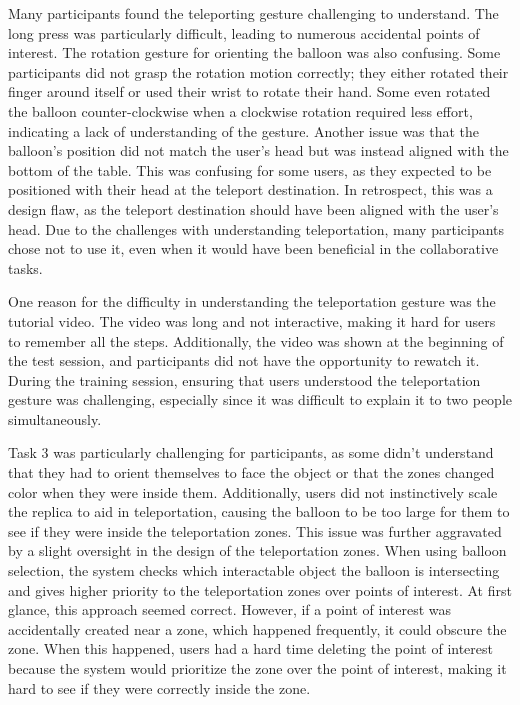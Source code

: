         Many participants found the teleporting gesture challenging to understand. The long press was particularly difficult, leading to numerous accidental points of interest. The rotation gesture for orienting the balloon was also confusing. Some participants did not grasp the rotation motion correctly; they either rotated their finger around itself or used their wrist to rotate their hand. Some even rotated the balloon counter-clockwise when a clockwise rotation required less effort, indicating a lack of understanding of the gesture. Another issue was that the balloon's position did not match the user's head but was instead aligned with the bottom of the table. This was confusing for some users, as they expected to be positioned with their head at the teleport destination. In retrospect, this was a design flaw, as the teleport destination should have been aligned with the user's head. Due to the challenges with understanding teleportation, many participants chose not to use it, even when it would have been beneficial in the collaborative tasks.
        
        One reason for the difficulty in understanding the teleportation gesture was the tutorial video. The video was long and not interactive, making it hard for users to remember all the steps. Additionally, the video was shown at the beginning of the test session, and participants did not have the opportunity to rewatch it. During the training session, ensuring that users understood the teleportation gesture was challenging, especially since it was difficult to explain it to two people simultaneously.

        Task 3 was particularly challenging for participants, as some didn't understand that they had to orient themselves to face the object or that the zones changed color when they were inside them. Additionally, users did not instinctively scale the replica to aid in teleportation, causing the balloon to be too large for them to see if they were inside the teleportation zones. This issue was further aggravated by a slight oversight in the design of the teleportation zones. When using balloon selection, the system checks which interactable object the balloon is intersecting and gives higher priority to the teleportation zones over points of interest. At first glance, this approach seemed correct. However, if a point of interest was accidentally created near a zone, which happened frequently, it could obscure the zone. When this happened, users had a hard time deleting the point of interest because the system would prioritize the zone over the point of interest, making it hard to see if they were correctly inside the zone.

